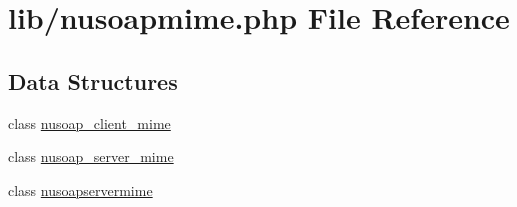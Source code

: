 \hypertarget{nusoapmime_8php}{}\section{lib/nusoapmime.php File Reference}
\label{nusoapmime_8php}
\subsection*{Data Structures}
\begin{DoxyCompactItemize}
\item 
class \hyperlink{classnusoap__client__mime}{nusoap\+\_\+client\+\_\+mime}
\item 
class \hyperlink{classnusoap__server__mime}{nusoap\+\_\+server\+\_\+mime}
\item 
class \hyperlink{classnusoapservermime}{nusoapservermime}
\end{DoxyCompactItemize}
